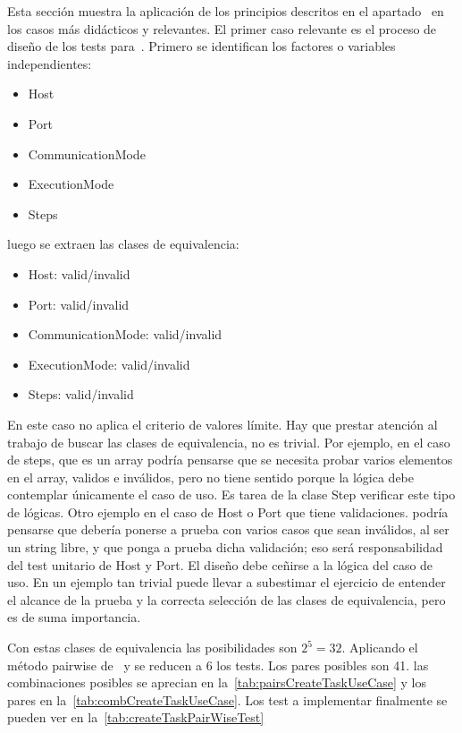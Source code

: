 Esta sección muestra la aplicación de los principios descritos en el apartado~ en los casos más didácticos y relevantes.
El primer caso relevante es el proceso de diseño de los tests para~.
Primero se identifican los factores o variables independientes:

\begin{itemize}
    \item Host
    \item Port
    \item CommunicationMode
    \item ExecutionMode
    \item Steps
\end{itemize}

luego se extraen las clases de equivalencia:

\begin{itemize}
    \item Host: valid/invalid
    \item Port: valid/invalid
    \item CommunicationMode: valid/invalid
    \item ExecutionMode: valid/invalid
    \item Steps: valid/invalid
\end{itemize}

En este caso no aplica el criterio de valores límite.
Hay que prestar atención al trabajo de buscar las clases de equivalencia, no es trivial.
Por ejemplo, en el caso de steps, que es un array podría pensarse que se necesita probar varios elementos en el array, validos e inválidos, pero no tiene sentido porque la lógica debe contemplar únicamente el caso de uso.
Es tarea de la clase Step verificar este tipo de lógicas.
Otro ejemplo en el caso de Host o Port que tiene validaciones.
podría pensarse que debería ponerse a prueba con varios casos que sean inválidos, al ser un string libre, y que ponga a prueba dicha validación;
eso será responsabilidad del test unitario de Host y Port.
El diseño debe ceñirse a la lógica del caso de uso.
En un ejemplo tan trivial puede llevar a subestimar el ejercicio de entender el alcance de la prueba y la correcta selección de las clases de equivalencia, pero es de suma importancia.

Con estas clases de equivalencia las posibilidades son $2^5 = 32$.
Aplicando el método pairwise de~ y se reducen a 6 los tests.
Los pares posibles son 41.
las combinaciones posibles se aprecian en la~\cref{tab:pairsCreateTaskUseCase} y los pares en la~\cref{tab:combCreateTaskUseCase}.
Los test a implementar finalmente se pueden ver en la~\cref{tab:createTaskPairWiseTest}

